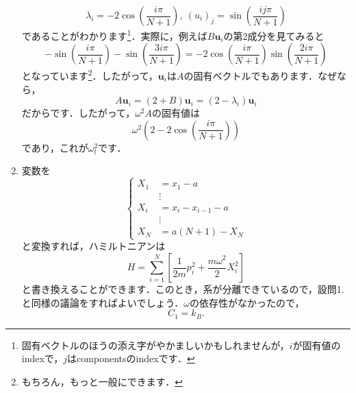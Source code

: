 \documentclass[a4paper,pdflatex,ja=standard]{bxjsarticle}
\begin{document}
\begin{enumerate}
  \begin{equation}
    \lambda_i
    =
    -
    2
    \cos\left( \frac{i\pi}{N+1} \right)
    ,\ 
    (u_i)_j
    =
    \sin\left( \frac{ij\pi}{N+1} \right)
  \end{equation}
  であることがわかります\footnote{
    固有ベクトルのほうの添え字がやかましいかもしれませんが，$i$が固有値のindexで，$j$はcomponentsのindexです．
  }．実際に，例えば$B\bm{u}_i$の第2成分を見てみると
  \begin{equation}
    -\sin\left( \frac{i\pi}{N+1} \right)
    -\sin\left( \frac{3i\pi}{N+1} \right)
    =
    -2\cos\left( \frac{i\pi}{N+1} \right)\sin\left( \frac{2i\pi}{N+1} \right)
  \end{equation}
  となっています\footnote{
    もちろん，もっと一般にできます．
  }．したがって，$\bm{u}_i$は$A$の固有ベクトルでもあります．なぜなら，
  \begin{equation}
    A\bm{u}_i
    =
    (2+B)\bm{u}_i
    =
    \left( 2-\lambda_i \right)\bm{u}_i
  \end{equation}
  だからです．したがって，$\omega^2A$の固有値は
  \begin{equation}
    \omega^2
    \left(  
      2-2\cos\left( \frac{i\pi}{N+1} \right)
    \right)
  \end{equation}
  であり，これが$\omega_l^2$です．

  \item 
  変数を
  \begin{equation}
    \left\{
      \begin{alignedat}{1}
        X_1&= x_1 - a \\
        &\vdots \\
        X_i &= x_i - x_{i-1} -a \\
        &\vdots \\
        X_N &= a(N+1) - X_N
      \end{alignedat}
    \right.
  \end{equation}
  と変換すれば，ハミルトニアンは
  \begin{equation}
    H
    =
    \sum_{i=1}^{N}
    \left[  
      \frac{1}{2m}p_i^2
      +
      \frac{m\omega^2}{2}X_i^2
    \right]
  \end{equation}
  と書き換えることができます．このとき，系が分離できているので，設問1.と同様の議論をすればよいでしょう．$\omega$の依存性がなかったので，
  \begin{equation}
    C_1
    =
    k_B
    .
  \end{equation}


\end{enumerate}
\end{document}
